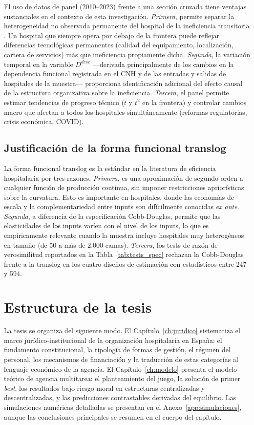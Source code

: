 El uso de datos de panel (2010--2023) frente a una sección cruzada tiene ventajas sustanciales en el contexto de esta investigación. \textit{Primera}, permite separar la heterogeneidad no observada permanente del hospital de la ineficiencia transitoria \citep{greene2005a}. Un hospital que siempre opera por debajo de la frontera puede reflejar diferencias tecnológicas permanentes (calidad del equipamiento, localización, cartera de servicios) más que ineficiencia propiamente dicha. \textit{Segunda}, la variación temporal en la variable $D^{desc}$ ---derivada principalmente de los cambios en la dependencia funcional registrada en el CNH y de las entradas y salidas de hospitales de la muestra--- proporciona identificación adicional del efecto causal de la estructura organizativa sobre la ineficiencia. \textit{Tercera}, el panel permite estimar tendencias de progreso técnico ($t$ y $t^2$ en la frontera) y controlar cambios macro que afectan a todos los hospitales simultáneamente (reformas regulatorias, crisis económica, COVID).

\subsection{Justificación de la forma funcional translog}

La forma funcional translog \citep{zuckerman1994,linna1998} es la estándar en la literatura de eficiencia hospitalaria por tres razones. \textit{Primera}, es una aproximación de segundo orden a cualquier función de producción continua, sin imponer restricciones apriorísticas sobre la curvatura. Esto es importante en hospitales, donde las economías de escala y la complementariedad entre inputs son difícilmente conocidas \textit{ex ante}. \textit{Segunda}, a diferencia de la especificación Cobb-Douglas, permite que las elasticidades de los inputs varíen con el nivel de los inputs, lo que es empíricamente relevante cuando la muestra incluye hospitales muy heterogéneos en tamaño (de 50 a más de 2.000 camas). \textit{Tercera}, los tests de razón de verosimilitud reportados en la Tabla~\ref{tab:tests_spec} rechazan la Cobb-Douglas frente a la translog en los cuatro diseños de estimación con estadísticos entre 247 y 594.

\section{Estructura de la tesis}

La tesis se organiza del siguiente modo. El Capítulo~\ref{ch:juridico} sistematiza el marco jurídico-institucional de la organización hospitalaria en España: el fundamento constitucional, la tipología de formas de gestión, el régimen del personal, los mecanismos de financiación y la traducción de estas categorías al lenguaje económico de la agencia. El Capítulo~\ref{ch:modelo} presenta el modelo teórico de agencia multitarea: el planteamiento del juego, la solución de primer \textit{best}, los resultados bajo riesgo moral en estructuras centralizadas y descentralizadas, y las predicciones contrastables derivadas del equilibrio. Las simulaciones numéricas detalladas se presentan en el Anexo~\ref{app:simulaciones}, aunque las conclusiones principales se resumen en el cuerpo del capítulo.

